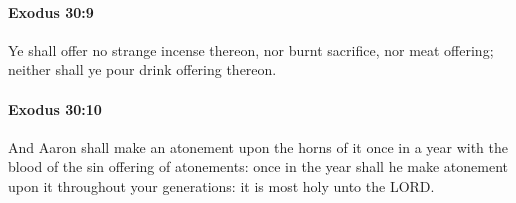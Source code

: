 		\paragraph{Exodus 30:9} %
			\label{EXODUS-30-9}

			Ye shall offer no strange incense thereon, nor burnt sacrifice, nor meat offering; neither shall ye pour drink offering thereon.


		\paragraph{Exodus 30:10} %
			\label{EXODUS-30-10}

			And Aaron shall make an atonement upon the horns of it once in a year with the blood of the sin offering of atonements: once in the year shall he make atonement upon it throughout your generations: it is most holy unto the LORD.


